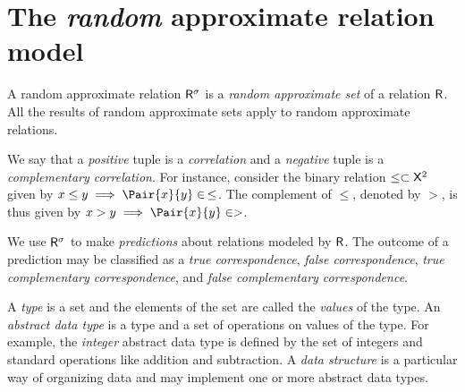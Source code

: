 \documentclass[11pt,final,hidelinks]{article}
\begin{document}
\providecommand{\mainx}{..}
\section{The \emph{random} approximate relation model}
A random approximate relation $\ARelation{R}$ is a \emph{random approximate set}\cite{aset} of a relation $\Relation{R}$.
All the results of random approximate sets apply to random approximate relations.

We say that a \emph{positive} tuple is a \emph{correlation} and a \emph{negative} tuple is a \emph{complementary correlation}.
For instance, consider the binary relation $\leq \subset \Set{X}^2$ given by $x \leq y \implies \Pair{x}{y} \in \, \leq$.
The complement of $\leq$, denoted by $>$, is thus given by $x > y \implies \Pair{x}{y} \in >$.

We use $\ARelation{R}$ to make \emph{predictions} about relations modeled by $\Relation{R}$.
The outcome of a prediction may be classified as a \emph{true correspondence}, \emph{false correspondence}, \emph{true complementary correspondence}, and \emph{false complementary correspondence}.

A \emph{type} is a set and the elements of the set are called the \emph{values} of the type.
An \emph{abstract data type} is a type and a set of operations on values of the type.
For example, the \emph{integer} abstract data type is defined by the set of integers and standard operations like addition and subtraction.
A \emph{data structure} is a particular way of organizing data and may implement one or more abstract data types.
\end{document}
